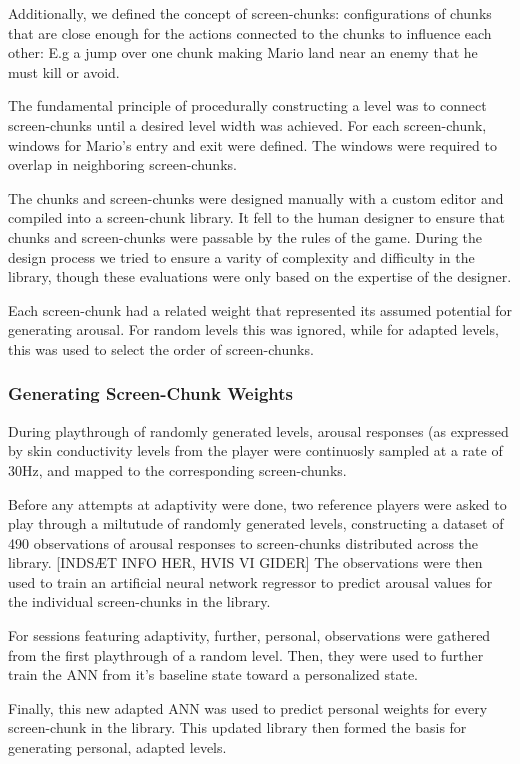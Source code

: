 \documentclass{llncs}
\begin{document}
Additionally, we defined the concept of screen-chunks: configurations of chunks that are close enough for the actions connected to the chunks to influence each other: E.g a jump over one chunk making Mario land near an enemy that he must kill or avoid.

The fundamental principle of procedurally constructing a level was to connect screen-chunks until a desired level width was achieved. For each screen-chunk, windows for Mario's entry and exit were defined. The windows were required to overlap in neighboring screen-chunks.

The chunks and screen-chunks were designed manually with a custom editor and compiled into a screen-chunk library. It fell to the human designer to ensure that chunks and screen-chunks were passable by the rules of the game. During the design process we tried to ensure a varity of complexity and difficulty in the library, though these evaluations were only based on the expertise of the designer.

Each screen-chunk had a related weight that represented its assumed potential for generating arousal. For random levels this was ignored, while for adapted levels, this was used to select the order of screen-chunks.

\subsubsection{Generating Screen-Chunk Weights}
During playthrough of randomly generated levels, arousal responses (as expressed by skin conductivity levels from the player were continuosly sampled at a rate of 30Hz, and mapped to the corresponding screen-chunks.

Before any attempts at adaptivity were done, two reference players were asked to play through a miltutude of randomly generated levels, constructing a dataset of 490 observations of arousal responses to screen-chunks distributed across the library. [INDSÆT INFO HER, HVIS VI GIDER] The observations were then used to train an artificial neural network regressor to predict arousal values for the individual screen-chunks in the library.

For sessions featuring adaptivity, further, personal, observations were gathered from the first playthrough of a random level. Then, they were used to further train the ANN from it's baseline state toward a personalized state.

Finally, this new adapted ANN was used to predict personal weights for every screen-chunk in the library. This updated library then formed the basis for generating personal, adapted levels.
\end{document}
